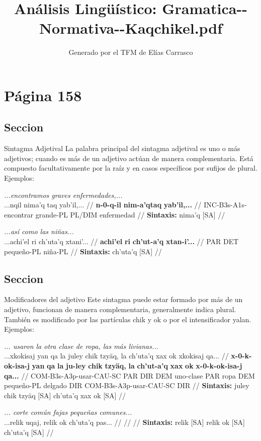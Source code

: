 \documentclass{article}%
\title{Análisis Lingüístico: Gramatica{-}{-}Normativa{-}{-}Kaqchikel.pdf}%
\author{Generado por el TFM de Elías Carrasco}%
\begin{document}
%
\normalsize%
\maketitle%
\section{Página 158}%
\label{sec:Pgina158}%
\subsection{Seccion}%
\label{subsec:Seccion}%

%
Sintagma Adjetival %
La palabra principal del sintagma adjetival es uno o más adjetivos; cuando es más de un %
adjetivo actúan de manera complementaria. Está compuesto facultativamente por la %
raíz y en casos específicos por sufijos de plural. Ejemplos: %
\par\medskip%
\ex
\textit{...encontramos graves enfermedades,...} \\
\begingl
\gla ...nqil nima'q taq yab'il,... //
\glb \textbf{n-}\textbf{0-}\textbf{q-}\textbf{il} \textbf{nim-}\textbf{a'qtaq} \textbf{yab'il,...} //
\glc INC-B3s-A1s-encontrar grande-PL PL/DIM enfermedad //
\glft \textbf{Sintaxis:} nima'q [\textsc{SA}] //
\endgl
\xe
%
\medskip%
\par\medskip%
\ex
\textit{...así como las niñas...} \\
\begingl
\gla ...achi'el ri ch'uta'q xtani'... //
\glb \textbf{achi'el} \textbf{ri} \textbf{ch'ut-}\textbf{a'q} \textbf{xtan-}\textbf{i'...} //
\glc PAR DET pequeño-PL niña-PL //
\glft \textbf{Sintaxis:} ch'uta'q [\textsc{SA}] //
\endgl
\xe
%
\medskip%
\subsection{Seccion}%
\label{subsec:Seccion}%

%
Modificadores del adjetivo %
Este sintagma puede estar formado por más de un adjetivo, funcionan de manera %
complementaria, generalmente indica plural. También es modificado por las partículas %
chik y ok o por el intensificador yalan. Ejemplos: %
\par\medskip%
\ex
\textit{... usaron la otra clase de ropa, las más livianas...} \\
\begingl
\gla ...xkokisaj yan qa la juley chik tzyäq, la ch'uta'q xax ok xkokisaj qa... //
\glb \textbf{x-}\textbf{0-}\textbf{k-}\textbf{ok-}\textbf{isa-}\textbf{j} \textbf{yan} \textbf{qa} \textbf{la} \textbf{ju-}\textbf{ley} \textbf{chik} \textbf{tzyäq,} \textbf{la} \textbf{ch'ut-}\textbf{a'q} \textbf{xax} \textbf{ok} \textbf{x-}\textbf{0-}\textbf{k-}\textbf{ok-}\textbf{isa-}\textbf{j} \textbf{qa...} //
\glc COM-B3s-A3p-usar-CAU-SC PAR DIR DEM uno-clase PAR ropa DEM pequeño-PL delgado DIR COM-B3s-A3p-usar-CAU-SC DIR //
\glft \textbf{Sintaxis:} juley chik tzyäq [\textsc{SA}] ch'uta'q xax ok [\textsc{SA}] //
\endgl
\xe
%
\medskip%
\par\medskip%
\ex
\textit{... corte común fajas pequeñas comunes...} \\
\begingl
\gla ...relik uqaj, relik ok ch'uta'q pas... //
\glb  //
\glc  //
\glft \textbf{Sintaxis:} relik [\textsc{SA}] relik ok [\textsc{SA}] ch'uta'q [\textsc{SA}] //
\endgl
\xe
%
\medskip
\end{document}
